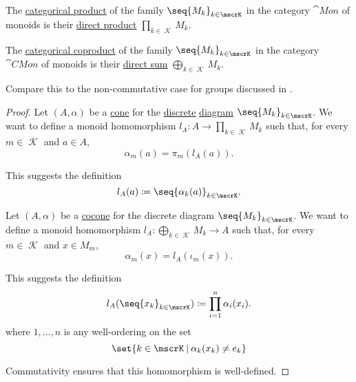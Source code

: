 \begin{proposition}\label{thm:monoid_categorical_limits}
  \hfill
  \begin{thmenum}
     The \hyperref[def:discrete_category_limits]{categorical product} of the family \( \seq{ M_k }_{k \in \mscrK} \) in the category \hyperref[def:monoid/category]{\( \cat{Mon} \)} of monoids is their \hyperref[def:monoid_direct_product]{direct product} \( \prod_{k \in \mscrK} M_k \).

     The \hyperref[def:discrete_category_limits]{categorical coproduct} of the family \( \seq{ M_k }_{k \in \mscrK} \) in the category \hyperref[def:monoid/category]{\( \cat{CMon} \)} of  monoids is their \hyperref[def:monoid_direct_product]{direct sum} \( \bigoplus_{k \in \mscrK} M_k \).

    Compare this to the non-commutative case for groups discussed in .
  \end{thmenum}
\end{proposition}
\begin{proof}
   Let \( (A, \alpha) \) be a \hyperref[def:category_of_cones/cone]{cone} for the \hyperref[def:discrete_category]{discrete} \hyperref[def:categorical_diagram]{diagram} \( \seq{ M_k }_{k \in \mscrK} \). We want to define a monoid homomorphism \( l_A: A \to \prod_{k \in \mscrK} M_k \) such that, for every \( m \in \mscrK \) and \( a \in A \),
  \begin{equation*}
    \alpha_m(a) = \pi_m(l_A(a)).
  \end{equation*}

  This suggests the definition
  \begin{equation*}
    l_A(a) \coloneqq \seq{ \alpha_k(a) }_{k \in \mscrK}.
  \end{equation*}

    Let \( (A, \alpha) \) be a \hyperref[def:category_of_cones/cocone]{cocone} for the discrete diagram \( \seq{ M_k }_{k \in \mscrK} \). We want to define a monoid homomorphism \( l_A: \bigoplus_{k \in \mscrK} M_k \to A \) such that, for every \( m \in \mscrK \) and \( x \in M_m \),
  \begin{equation*}
    \alpha_m(x) = l_A(\iota_m(x)).
  \end{equation*}

  This suggests the definition
  \begin{equation*}
    l_A(\seq{ x_k }_{k \in \mscrK}) \coloneqq \prod_{i=1}^n \alpha_i(x_i).
  \end{equation*}
  where \( 1, \ldots, n \) is any well-ordering on the set
  \begin{equation*}
    \set{ k \in \mscrK \given \alpha_k(x_k) \neq e_k }
  \end{equation*}

  Commutativity ensures that this homomorphism is well-defined.
\end{proof}

